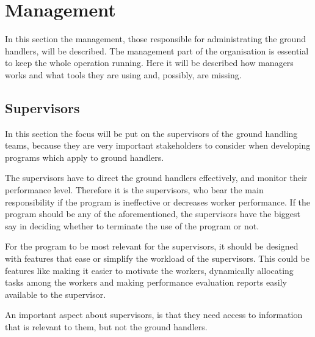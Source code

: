 \section{Management}
In this section the management, those responsible for administrating the ground handlers, will be described. The management part of the organisation is essential to keep the whole operation running. Here it will be described how managers works and what tools they are using and, possibly, are missing.
\subsection{Supervisors}
In this section the focus will be put on the supervisors of the ground handling teams, because they are very important stakeholders to consider when developing programs which apply to ground handlers.

The supervisors have to direct the ground handlers effectively, and monitor their performance level. Therefore it is the supervisors, who bear the main responsibility if the program is ineffective or decreases worker performance. If the program should be any of the aforementioned, the supervisors have the biggest say in deciding whether to terminate the use of the program or not.

For the program to be most relevant for the supervisors, it should be designed with features that ease or simplify the workload of the supervisors. This could be features like making it easier to motivate the workers, dynamically allocating tasks among the workers and making performance evaluation reports easily available to the supervisor.

An important aspect about supervisors, is that they need access to information that is relevant to them, but not the ground handlers.
